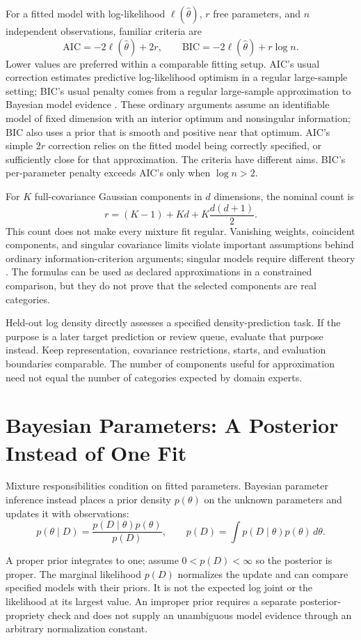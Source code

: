 For a fitted model with log-likelihood $\ell(\hat\theta)$, $r$ free parameters, and $n$ independent observations, familiar criteria are
\[
\mathrm{AIC}=-2\ell(\hat\theta)+2r,\qquad
\mathrm{BIC}=-2\ell(\hat\theta)+r\log n.
\]
Lower values are preferred within a comparable fitting setup. AIC's usual correction estimates predictive log-likelihood optimism in a regular large-sample setting; BIC's usual penalty comes from a regular large-sample approximation to Bayesian model evidence \citep{akaike1974aic,schwarz1978bic}. These ordinary arguments assume an identifiable model of fixed dimension with an interior optimum and nonsingular information; BIC also uses a prior that is smooth and positive near that optimum. AIC's simple $2r$ correction relies on the fitted model being correctly specified, or sufficiently close for that approximation. The criteria have different aims. BIC's per-parameter penalty exceeds AIC's only when $\log n>2$.

For $K$ full-covariance Gaussian components in $d$ dimensions, the nominal count is
\[
r=(K-1)+Kd+K\frac{d(d+1)}2.
\]
This count does not make every mixture fit regular. Vanishing weights, coincident components, and singular covariance limits violate important assumptions behind ordinary information-criterion arguments; singular models require different theory \citep{watanabe2013wbic}. The formulas can be used as declared approximations in a constrained comparison, but they do not prove that the selected components are real categories.

Held-out log density directly assesses a specified density-prediction task. If the purpose is a later target prediction or review queue, evaluate that purpose instead. Keep representation, covariance restrictions, starts, and evaluation boundaries comparable. The number of components useful for approximation need not equal the number of categories expected by domain experts.

\par{}\noindent\begin{minipage}{\linewidth}
\section{Bayesian Parameters: A Posterior Instead of One Fit}
\label{sec:bayesian-reasoning}

Mixture responsibilities condition on fitted parameters. Bayesian parameter inference instead places a prior density $p(\theta)$ on the unknown parameters and updates it with observations:
\[
p(\theta\mid D)=\frac{p(D\mid\theta)p(\theta)}{p(D)},
\qquad p(D)=\int p(D\mid\theta)p(\theta)\,d\theta.
\]
\end{minipage}\par\addvspace{\belowdisplayskip}
A proper prior integrates to one; assume $0<p(D)<\infty$ so the posterior is proper. The marginal likelihood $p(D)$ normalizes the update and can compare specified models with their priors. It is not the expected log joint or the likelihood at its largest value. An improper prior requires a separate posterior-propriety check and does not supply an unambiguous model evidence through an arbitrary normalization constant.

